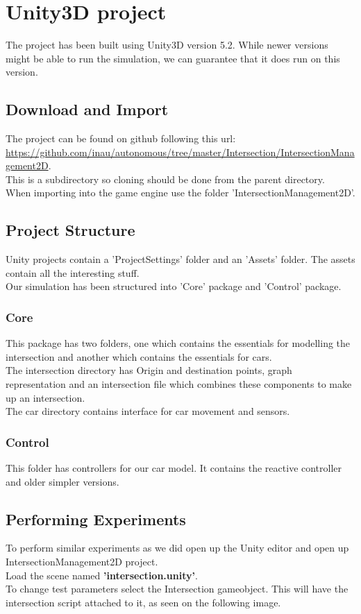 \section{Unity3D project}
The project has been built using Unity3D version 5.2.
While newer versions might be able to run the simulation, we can guarantee that it does run on this version.\\

\subsection*{Download and Import}
The project can be found on github following this url: \url{https://github.com/inau/autonomous/tree/master/Intersection/IntersectionManagement2D}.\\
This is a subdirectory so cloning should be done from the parent directory.\\
When importing into the game engine use the folder 'IntersectionManagement2D'.\\

\subsection*{Project Structure}
\noindent
Unity projects contain a 'ProjectSettings' folder and an 'Assets' folder. The assets contain all the interesting stuff.\\
\noindent
Our simulation has been structured into 'Core' package and 'Control' package.\\
\subsubsection*{Core}
This package has two folders, one which contains the essentials for modelling the intersection and another which contains the essentials for cars.\\
The intersection directory has Origin and destination points, graph representation and an intersection file which combines these components to make up an intersection.\\
The car directory contains interface for car movement and sensors.\\
\subsubsection*{Control}
This folder has controllers for our car model. It contains the reactive controller and older simpler versions.
\pagebreak
\subsection*{Performing Experiments}
To perform similar experiments as we did open up the Unity editor and open up IntersectionManagement2D project.\\
Load the scene named \textbf{'intersection.unity'}.\\
To change test parameters select the Intersection gameobject. This will have the intersection script attached to it, as seen on the following image.\\

